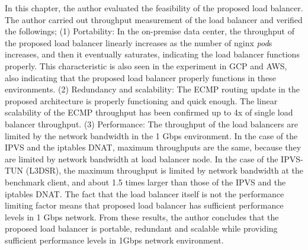 In this chapter, the author evaluated the feasibility of the proposed load balancer.
The author carried out throughput measurement of the load balancer and verified the followings;
  (1) Portability: In the on-premise data center, the throughput of the proposed load balancer linearly increases as the number of nginx {\em pod}s increases, and then it eventually saturates, indicating the load balancer functions properly.
  This characteristic is also seen in the experiment in GCP and AWS, also indicating that the proposed load balancer properly functions in these environments.
  (2) Redundancy and scalability: The ECMP routing update in the proposed architecture is properly functioning and quick enough.
  The linear scalability of the ECMP throughput has been confirmed up to 4x of single load balancer throughput.
  (3) Performance: The throughput of the load balancers are limited by the network bandwidth in the 1 Gbps environment.
  In the case of the IPVS and the iptables DNAT, maximum throughputs are the same, because they are limited by network bandwidth at load balancer node.
  In the case of the IPVS-TUN (L3DSR), the maximum throughput is limited by network bandwidth at the benchmark client, and about 1.5 times larger than those of the IPVS and the iptables DNAT.
  The fact that the load balancer itself is not the performance limiting factor means that proposed load balancer has sufficient performance levels in 1 Gbps network.
  From these results, the author concludes that the proposed load balancer is portable, redundant and scalable while providing sufficient performance levels in 1Gbps network environment.

%

